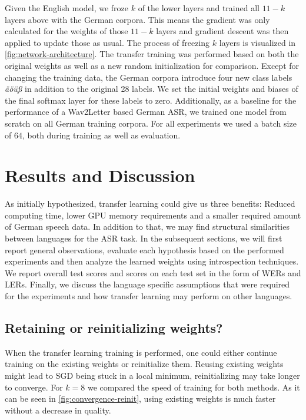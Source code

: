 \documentclass[11pt,a4paper]{article}
\begin{document}
Given the English model, we froze $k$ of the lower layers and trained all $11 - k$ layers above with the German corpora.
This means the gradient was only calculated for the weights of those $11 - k$ layers and gradient descent was then applied to update those as usual.
The process of freezing $k$ layers is visualized in \autoref{fig:network-architecture}.
The transfer training was performed based on both the original weights as well as a new random initialization for comparison.
Except for changing the training data, the German corpora introduce four new class labels \emph{\"a\"o\"u\ss{}} in addition to the original 28 labels.
We set the initial weights and biases of the final softmax layer for these labels to zero.
Additionally, as a baseline for the performance of a Wav2Letter based German \ac{ASR}, we trained one model from scratch on all German training corpora.
For all experiments we used a batch size of $64$, both during training as well as evaluation.


\section{Results and Discussion}\label{sec:results}

As initially hypothesized, transfer learning could give us three benefits:
Reduced computing time, lower GPU memory requirements and a smaller required amount of German speech data.
In addition to that, we may find structural similarities between languages for the \ac{ASR} task.
In the subsequent sections, we will first report general observations,
evaluate each hypothesis based on the performed experiments and then analyze the learned weights using introspection techniques.
We report overall test scores and scores on each test set in the form of \acp{WER} and \acp{LER}.
Finally, we discuss the language specific assumptions that were required for the experiments and how transfer learning may perform on other languages.

\subsection{Retaining or reinitializing weights?}

When the transfer learning training is performed, one could either continue training on the existing weights or reinitialize them.
Reusing existing weights might lead to \ac{SGD} being stuck in a local minimum, reinitializing may take longer to converge.
For $k = 8$ we compared the speed of training for both methods.
As it can be seen in \autoref{fig:convergence-reinit}, using existing weights is much faster without a decrease in quality.
\end{document}
